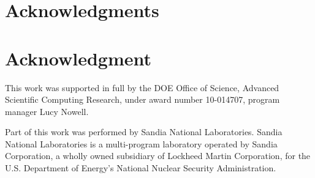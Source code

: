 \documentclass[10pt,journal,cspaper,compsoc]{IEEEtran}
\begin{document}
\appendices


\ifCLASSOPTIONcompsoc
  \section*{Acknowledgments}
\else
  \section*{Acknowledgment}
\fi


This work was supported in full by the DOE Office of Science, Advanced Scientific Computing Research, under award number 10-014707, program manager Lucy Nowell.

Part of this work was performed by Sandia National Laboratories.  Sandia National Laboratories is a multi-program laboratory operated by Sandia Corporation, a wholly owned subsidiary of Lockheed Martin Corporation, for the U.S. Department of Energy's National Nuclear Security Administration.


\ifCLASSOPTIONcaptionsoff
  \newpage
\fi






\end{document}
